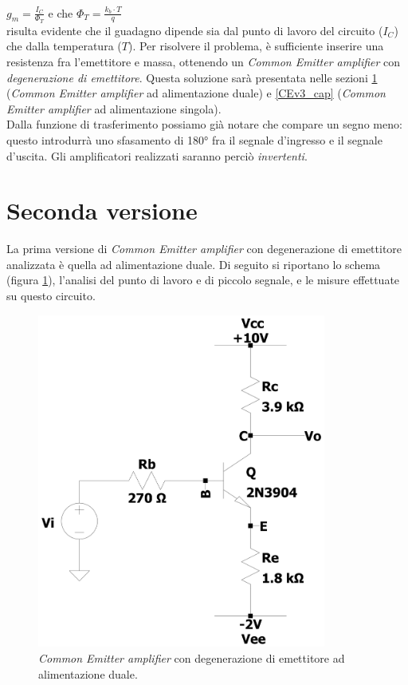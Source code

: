 \documentclass{report}
\begin{document}
\\[2pt]\indent $\displaystyle{g_m=\frac{I_C}{\Phi_T}}$ e che $\displaystyle{\Phi_T=\frac{k_b\cdot T}{q}}$
\\[2pt]risulta evidente che il guadagno dipende sia dal punto di lavoro del circuito ($I_C$) che dalla temperatura ($T$). Per risolvere il problema, è sufficiente inserire una resistenza fra l'emettitore e massa, ottenendo un \textit{Common Emitter amplifier} con \textit{degenerazione di emettitore}. Questa soluzione sarà presentata nelle sezioni \ref{CEv2_cap} (\textit{Common Emitter amplifier} ad alimentazione duale) e \ref{CEv3_cap} (\textit{Common Emitter amplifier} ad alimentazione singola). 
\\\indent Dalla funzione di trasferimento possiamo già notare che compare un segno meno: questo introdurrà uno sfasamento di 180° fra il segnale d'ingresso e il segnale d'uscita. Gli amplificatori realizzati saranno perciò \textit{invertenti}.
\section{Seconda versione} \label{CEv2_cap}%
La prima versione di \textit{Common Emitter amplifier} con degenerazione di emettitore analizzata è quella ad alimentazione duale. Di seguito si riportano lo schema (figura \ref{figura:CEv2}), l'analisi del punto di lavoro e di piccolo segnale, e le misure effettuate su questo circuito. 
\begin{figure}[h]
\centering
\includegraphics[height=11cm]{immagini/CEv2}
\caption{\textit{Common Emitter amplifier} con degenerazione di emettitore ad alimentazione duale.}
\label{figura:CEv2}
\end{figure}
\end{document}
